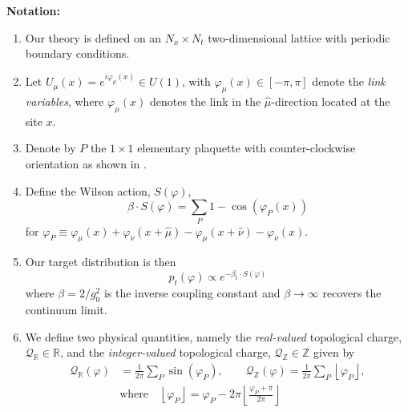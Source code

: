 \documentclass{article} %
\begin{document}
\textbf{Notation:} 
\begin{enumerate}
   \item Our theory is defined on an \(N_{x}\times N_{t}\) two-dimensional lattice with periodic boundary conditions.
   \item Let \(U_{\mu}(x) = e^{i\varphi_{\mu}(x)} \in U(1)\), with \(\varphi_{\mu}(x) \in [-\pi,\pi]\) denote the
      \emph{link variables}, where \(\varphi_{\mu}(x)\) denotes the link in the \(\hat{\mu}\)-direction located at the
      site \(x\).
   \item Denote by \(P\) the \(1\times1\) elementary plaquette with counter-clockwise orientation as shown in
      .
   \item Define the Wilson action, \(S(\varphi)\),
      \begin{equation}
         \beta\cdot S(\varphi) = \sum_{P} 1 - \cos(\varphi_{P}(x))
      \end{equation}
      for \(\varphi_{P} \equiv \varphi_{\mu}(x) + \varphi_{\nu}(x+\hat{\mu}) -
      \varphi_{\mu}(x+\hat{\nu})-\varphi_{\nu}(x)\).
   \item Our target distribution is then
      \begin{equation}
         p_{t}(\varphi) \propto e^{-\beta_{t}\cdot S(\varphi)}
      \end{equation}
      where \(\beta = 2/g_{0}^{2}\) is the inverse coupling constant and \(\beta\rightarrow\infty\) recovers the
      continuum limit.
   \item We define two physical quantities, namely the  \emph{real-valued} topological charge,
      \(\mathcal{Q}_{\mathbb{R}}\in \mathbb{R}\), and the \emph{integer-valued} topological charge,
      \(\mathcal{Q}_{\mathbb{Z}}\in \mathbb{Z}\) given by
      \begin{align}
         \mathcal{Q}_{\mathbb{R}}(\varphi)
            &= \frac{1}{2\pi}\sum_{P}\sin(\varphi_{P})\label{eq:qr}, \quad\quad
         \mathcal{Q}_{\mathbb{Z}}(\varphi) = \frac{1}{2\pi}\sum_{P}\left\lfloor\varphi_{P}\right\rfloor,\\
         \quad&\text{where}\quad \left\lfloor\varphi_{P}\right\rfloor = \varphi_{P} -
            2\pi\left\lfloor\frac{\varphi_{P}+\pi}{2\pi}\right\rfloor\label{eq:qz}
      \end{align}
\end{enumerate}
\end{document}
